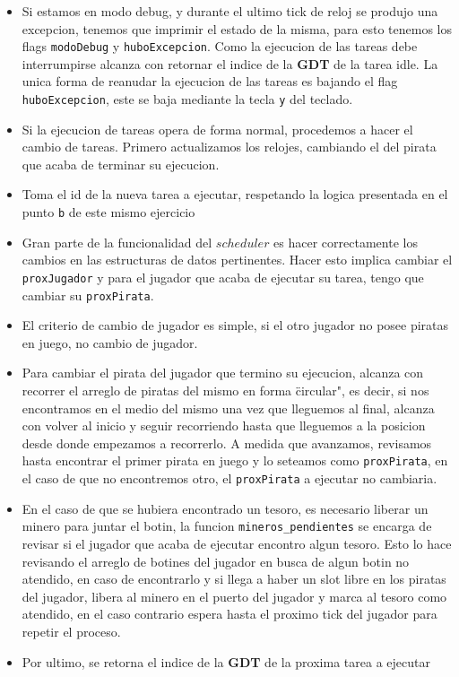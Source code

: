 \begin{itemize}
	\item Si estamos en modo debug, y durante el ultimo tick de reloj se produjo una excepcion, tenemos que imprimir el estado de la misma, para esto tenemos los flags \texttt{modoDebug} y \texttt{huboExcepcion}. Como la ejecucion de las tareas debe interrumpirse alcanza con retornar el indice de la \textbf{GDT} de la tarea idle. La unica forma de reanudar la ejecucion de las tareas es bajando el flag \texttt{huboExcepcion}, este se baja mediante la tecla \texttt{y} del teclado.
	\item Si la ejecucion de tareas opera de forma normal, procedemos a hacer el cambio de tareas. Primero actualizamos los relojes, cambiando el del pirata que acaba de terminar su ejecucion.
	\item Toma el id de la nueva tarea a ejecutar, respetando la logica presentada en el punto \texttt{b} de este mismo ejercicio
	\item Gran parte de la funcionalidad del $scheduler$ es hacer correctamente los cambios en las estructuras de datos pertinentes. Hacer esto implica cambiar el \texttt{proxJugador} y para el jugador que acaba de ejecutar su tarea, tengo que cambiar su \texttt{proxPirata}.
	\item El criterio de cambio de jugador es simple, si el otro jugador no posee piratas en juego, no cambio de jugador.
	\item Para cambiar el pirata del jugador que termino su ejecucion, alcanza con recorrer el arreglo de piratas del mismo en forma \"circular", es decir, si nos encontramos en el medio del mismo una vez que lleguemos al final, alcanza con volver al inicio y seguir recorriendo hasta que lleguemos a la posicion desde donde empezamos a recorrerlo. A medida que avanzamos, revisamos hasta encontrar el primer pirata en juego y lo seteamos como \texttt{proxPirata}, en el caso de que no encontremos otro, el \texttt{proxPirata} a ejecutar no cambiaria.
	\item En el caso de que se hubiera encontrado un tesoro, es necesario liberar un minero para juntar el botin, la funcion \texttt{mineros\_pendientes} se encarga de revisar si el jugador que acaba de ejecutar encontro algun tesoro. Esto lo hace revisando el arreglo de botines del jugador en busca de algun botin no atendido, en caso de encontrarlo y si llega a haber un slot libre en los piratas del jugador, libera al minero en el puerto del jugador y marca al tesoro como atendido, en el caso contrario espera hasta el proximo tick del jugador para repetir el proceso.
	\item Por ultimo, se retorna el indice de la \textbf{GDT} de la proxima tarea a ejecutar
\end{itemize}

